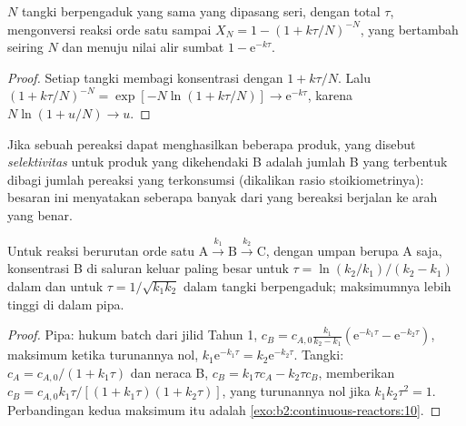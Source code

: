 \begin{proposition}\label{prop:b2:continuous-reactors:cascade}
$N$ tangki berpengaduk yang sama yang dipasang seri, dengan 
total $\tau$, mengonversi reaksi orde satu sampai
$X_N = 1 - (1 + k\tau/N)^{-N}$, yang bertambah seiring $N$ dan menuju
nilai alir sumbat $1 - \mathrm e^{-k\tau}$.
\end{proposition}

\begin{proof}
Setiap tangki membagi konsentrasi dengan $1 + k\tau/N$. Lalu
$(1 +
k\tau/N)^{-N} = \exp[-N\ln(1 + k\tau/N)] \to \mathrm e^{-k\tau}$,
karena $N\ln(1 + u/N) \to u$.
\end{proof}

\begin{definition}[Selektivitas]\label{def:b2:continuous-reactors:selectivity}
Jika sebuah pereaksi dapat menghasilkan beberapa produk, yang disebut
\emph{selektivitas} untuk produk yang dikehendaki B
adalah jumlah B yang terbentuk dibagi jumlah pereaksi yang terkonsumsi
(dikalikan rasio stoikiometrinya): besaran ini menyatakan seberapa banyak
dari yang bereaksi berjalan ke arah yang benar.
\end{definition}

\begin{proposition}\label{prop:b2:continuous-reactors:consecutive}
Untuk reaksi berurutan orde satu $\mathrm A \xrightarrow{k_1} \mathrm B
\xrightarrow{k_2} \mathrm C$, dengan umpan berupa A saja, konsentrasi B di
saluran keluar paling besar untuk $\tau = \ln(k_2/k_1)/(k_2 - k_1)$ dalam
 dan untuk $\tau = 1/\sqrt{k_1k_2}$ dalam tangki
berpengaduk; maksimumnya lebih tinggi di dalam pipa.
\end{proposition}

\begin{proof}
Pipa: hukum batch dari jilid Tahun 1, $c_B = c_{A,0}\frac{k_1}{k_2 - k_1}
(\mathrm e^{-k_1\tau} - \mathrm e^{-k_2\tau})$, maksimum ketika turunannya
nol, $k_1\mathrm e^{-k_1\tau} = k_2\mathrm e^{-k_2\tau}$. Tangki:
$c_A =
c_{A,0}/(1 + k_1\tau)$ dan neraca B, $c_B = k_1\tau c_A - k_2\tau c_B$,
memberikan $c_B = c_{A,0}k_1\tau/[(1 + k_1\tau)(1 + k_2\tau)]$, yang
turunannya nol jika $k_1k_2\tau^2 = 1$. Perbandingan kedua maksimum itu
adalah \cref{exo:b2:continuous-reactors:10}.
\end{proof}

